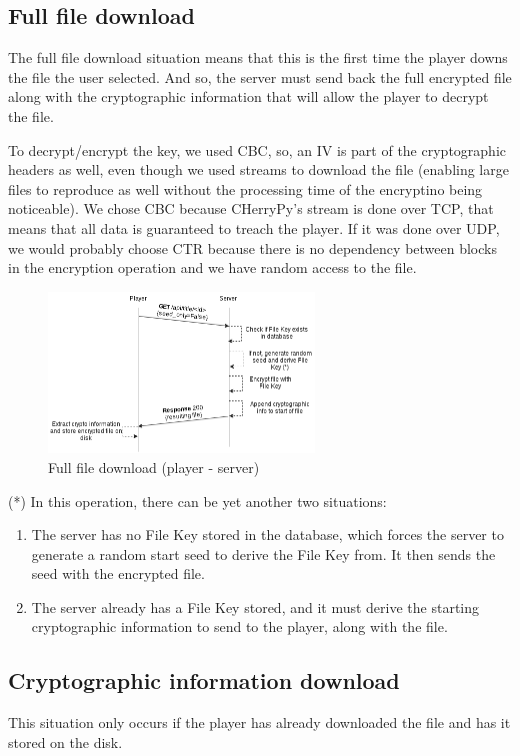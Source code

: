 \documentclass[11pt,a4paper]{report}
\begin{document}
\subsection{Full file download}
The full file download situation means that this is the first time the player downs the file the user selected.
And so, the server must send back the full encrypted file along with the cryptographic information that will allow the player to decrypt the file.

To decrypt/encrypt the key, we used CBC, so, an IV is part of the cryptographic headers as well, even though we used streams to download the file (enabling large files to reproduce as well without the processing time of the encryptino being noticeable).
We chose CBC because CHerryPy's stream is done over TCP, that means that all data is guaranteed to treach the player. If it was done over UDP, we would probably choose CTR because there is no dependency between blocks in the encryption operation and we have random access to the file. 

\begin{figure}[H]
\centerline{\includegraphics[width=200pt]{images/fullFileDown.png}}
\caption{Full file download (player - server)}
\label{player}
\end{figure}

(*) In this operation, there can be yet another two situations:

\begin{enumerate}
  \item The server has no File Key stored in the database, which forces the server to generate a random start seed to derive the File Key from. It then sends the seed with the encrypted file.
  \item The server already has a File Key stored, and it must derive the starting cryptographic information to send to the player, along with the file.
\end{enumerate}

\subsection{Cryptographic information download}
This situation only occurs if the player has already downloaded the file and has it stored on the disk.
\end{document}
